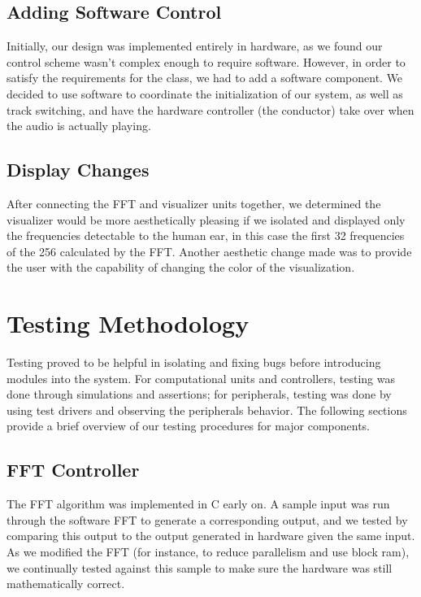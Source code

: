 \documentclass{article}
\begin{document}
\subsection{Adding Software Control}

Initially, our design was implemented entirely in hardware, as we found our control 
scheme wasn't complex enough to require software. However, in order to satisfy the 
requirements for the class, we had to add a software component. We decided to use 
software to coordinate the initialization of our system, as well as track switching, and 
have the hardware controller (the conductor) take over when the audio is actually 
playing. 

\subsection{Display Changes}

After connecting the FFT and visualizer units together, we determined the visualizer 
would be more aesthetically pleasing if we isolated and displayed only the 
frequencies detectable to the human ear, in this case the first 32 frequencies of the 
256 calculated by the FFT.  Another aesthetic change made was to provide the user 
with the capability of changing the color of the visualization.

\section{Testing Methodology}

Testing proved to be helpful in isolating and fixing bugs before introducing
modules into the system. For computational units and controllers, testing was
done through simulations and assertions; for peripherals, testing was done by
using test drivers and observing the peripherals behavior. The following
sections provide a brief overview of our testing procedures for major
components.

\subsection{FFT Controller}

The FFT algorithm was implemented in C early on. A sample input was run through
the software FFT to generate a corresponding output, and we tested by comparing
this output to the output generated in hardware given the same input. As we
modified the FFT (for instance, to reduce parallelism and use block ram), we
continually tested against this sample to make sure the hardware was still
mathematically correct.
\end{document}
